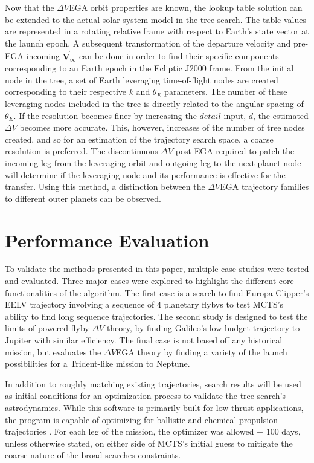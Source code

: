 \documentclass[letterpaper, preprint, paper,11pt]{AAS}	%
\begin{document}
Now that the $\Delta V$EGA orbit properties are known, the lookup table solution can be extended to the actual solar system model in the tree search. The table values are represented in a rotating relative frame with respect to Earth's state vector at the launch epoch. A subsequent transformation of the departure velocity and pre-EGA incoming $\vec{\textbf{V}}_{\infty}$ can be done in order to find their specific components corresponding to an Earth epoch in the Ecliptic J2000 frame. From the initial node in the tree, a set of Earth leveraging time-of-flight nodes are created corresponding to their respective $k$ and $\theta_E$ parameters. The number of these leveraging nodes included in the tree is directly related to the angular spacing of $\theta_E$. If the resolution becomes finer by increasing the $\textit{detail}$ input, $d$, the estimated $\Delta V$ becomes more accurate. This, however, increases of the number of tree nodes created, and so for an estimation of the trajectory search space, a coarse resolution is preferred. The discontinuous $\Delta V$ post-EGA required to patch the incoming leg from the leveraging orbit and outgoing leg to the next planet node will determine if the leveraging node and its performance is effective for the transfer. Using this method, a distinction between the $\Delta V$EGA trajectory families to different outer planets can be observed.

\section*{Performance Evaluation}

To validate the methods presented in this paper, multiple case studies were tested and evaluated. Three major cases were explored to highlight the different core functionalities of the algorithm. The first case is a search to find Europa Clipper's EELV\cite{Buffington2014} trajectory involving a sequence of 4 planetary flybys to test MCTS's ability to find long sequence trajectories. The second study is designed to test the limits of powered flyby $\Delta V$ theory, by finding Galileo's low budget trajectory to Jupiter with similar efficiency. The final case is not based off any historical mission, but evaluates the $\Delta V$EGA theory by finding a variety of the launch possibilities for a Trident-like mission to Neptune.

In addition to roughly matching existing trajectories, search results will be used as initial conditions for an optimization process to validate the tree search's astrodynamics. While this software is primarily built for low-thrust applications, the program is capable of optimizing for ballistic and chemical propulsion trajectories \cite{Sims2006}. For each leg of the mission, the optimizer was allowed $\pm$ 100 days, unless otherwise stated, on either side of MCTS's initial guess to mitigate the coarse nature of the broad searches constraints.
\end{document}
